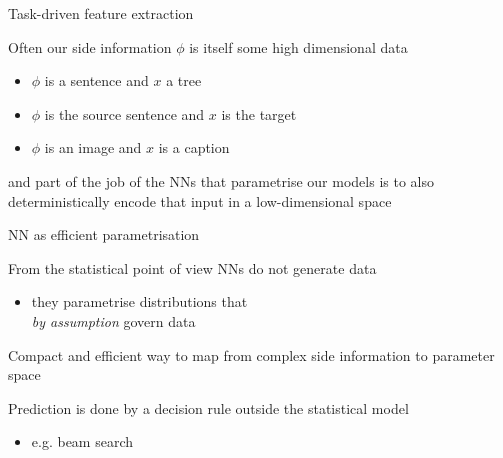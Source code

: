 \documentclass[14pt]{beamer}
\begin{document}
\begin{frame}{Task-driven feature extraction}

Often our side information $\phi$ is itself some high dimensional data
\begin{itemize}
	\item $\phi$ is a sentence and $x$ a tree
	\item $\phi$ is the source sentence and $x$ is the target
	\item $\phi$ is an image and $x$ is a caption
\end{itemize}
and part of the job of the NNs that parametrise our models is to also \alert{deterministically} encode that input in a low-dimensional space


\end{frame}


\begin{frame}{NN as efficient parametrisation}

From the statistical point of view NNs do not generate data\\
\begin{itemize}
	\item \alert{they parametrise distributions} that \\
	\emph{by assumption} govern data
\end{itemize}


Compact and efficient way to \alert{map from complex side information to parameter space}

\vspace{10pt}


Prediction is done by a decision rule outside the statistical model
\begin{itemize}
	\item e.g. beam search
\end{itemize}

\end{frame}
\end{document}
